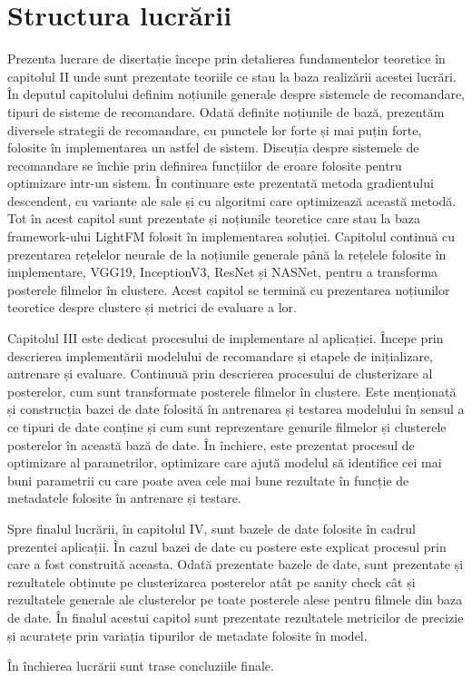 \section{Structura lucrării}
Prezenta lucrare de disertație începe prin detalierea fundamentelor teoretice în capitolul II unde sunt prezentate teoriile ce stau la baza realizării acestei lucrări. În deputul capitolului definim noțiunile generale despre sistemele de recomandare, tipuri de sisteme de recomandare. Odată definite noțiunile de bază, prezentăm diversele strategii de recomandare, cu punctele lor forte și mai puțin forte, folosite în implementarea un astfel de sistem. Discuția despre sistemele de recomandare se închie prin definirea funcțiilor de eroare folosite pentru optimizare intr-un sistem. În continuare este prezentată metoda gradientului descendent, cu variante ale sale și cu algoritmi care optimizează această metodă. Tot în acest capitol sunt prezentate și noțiunile teoretice care stau la baza framework-ului LightFM folosit în implementarea soluției. Capitolul continuă cu prezentarea rețelelor neurale de la noțiunile generale până la rețelele folosite în implementare, VGG19, InceptionV3, ResNet și NASNet, pentru a transforma posterele filmelor în clustere. Acest capitol se termină cu prezentarea noțiunilor teoretice despre clustere și metrici de evaluare a lor.

Capitolul III este dedicat procesului de implementare al aplicației. Începe prin descrierea implementării modelului de recomandare și etapele de inițializare, antrenare și evaluare. Continuuă prin descrierea procesului de clusterizare al posterelor, cum sunt transformate posterele filmelor în clustere. Este menționată și construcția bazei de date folosită în antrenarea și testarea modelului în sensul a ce tipuri de date conține și cum sunt reprezentare genurile filmelor și clusterele posterelor în această bază de date. În închiere, este prezentat procesul de optimizare al parametrilor, optimizare care ajută modelul să identifice cei mai buni parametrii cu care poate avea cele mai bune rezultate în funcție de metadatele folosite în antrenare și testare.

Spre finalul lucrării, în capitolul IV, sunt bazele de date folosite în cadrul prezentei aplicații. În cazul bazei de date cu postere este explicat procesul prin care a fost construită aceasta. Odată prezentate bazele de date, sunt prezentate și rezultatele obținute pe clusterizarea posterelor atât pe sanity check cât și rezultatele generale ale clusterelor pe toate posterele alese pentru filmele din baza de date. În finalul acestui capitol sunt prezentate rezultatele metricilor de precizie și acuratețe prin variația tipurilor de metadate folosite în model.

În închierea lucrării sunt trase concluziile finale.